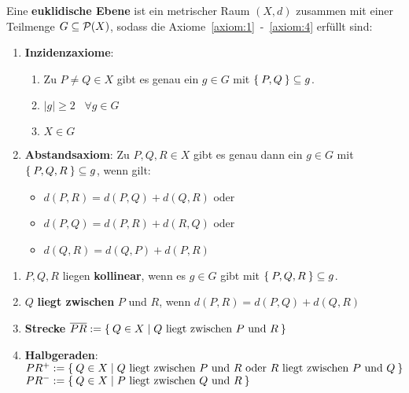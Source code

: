 \begin{definition}%
    Eine \textbf{euklidische Ebene} ist ein metrischer Raum $(X,d)$ 
    zusammen mit einer Teilmenge $G \subseteq \mathcal{P}(X)$, sodass die
    Axiome~\ref{axiom:1}~-~\ref{axiom:4} erfüllt sind:
    \begin{enumerate}[label=§\arabic*),ref=§\arabic*]
        \item \textbf{Inzidenzaxiome}:\label{axiom:1}
            \begin{enumerate}[label=(\roman*),ref=\theenumi{} (\roman*)]
                \item Zu $P \neq Q \in X$ gibt es genau ein $g \in G$ mit
                      $\Set{P, Q} \subseteq g$.
                \item $|g| \geq 2 \;\;\; \forall g \in G$
                \item $X \in G$
            \end{enumerate}
        \item \textbf{Abstandsaxiom}: Zu $P, Q, R \in X$ gibt es \label{axiom:2}
              genau dann ein $g \in G$ mit $\Set{P, Q, R} \subseteq g$,
              wenn gilt: 
              \begin{itemize}[]
                \item $d(P, R) = d(P, Q) + d(Q, R)$ oder
                \item $d(P, Q) = d(P, R) + d(R, Q)$ oder
                \item $d(Q, R) = d(Q, P) + d(P, R)$
              \end{itemize}
    \end{enumerate}
\end{definition}

\begin{definition}
    \begin{enumerate}[label=\alph*)]
        \item $P, Q, R$ liegen \textbf{kollinear}, 
              wenn es $g \in G$ gibt mit $\Set{P, Q, R} \subseteq g$.
        \item $Q$ \textbf{liegt zwischen} $P$
              und $R$, wenn $d(P, R) = d(P, Q) + d(Q, R)$
        \item \textbf{Strecke} $\overline{PR} := \Set{Q \in X | Q \text{ liegt zwischen } P \text{ und } R}$
        \item \textbf{Halbgeraden}:\\
              $PR^+ := \Set{Q \in X | Q \text{ liegt zwischen } P \text{ und } R \text{ oder } R \text{ liegt zwischen } P \text{ und } Q}$\\
              $PR^- := \Set{Q \in X | P \text{ liegt zwischen } Q \text{ und } R}$\\ 
    \end{enumerate}
\end{definition}


